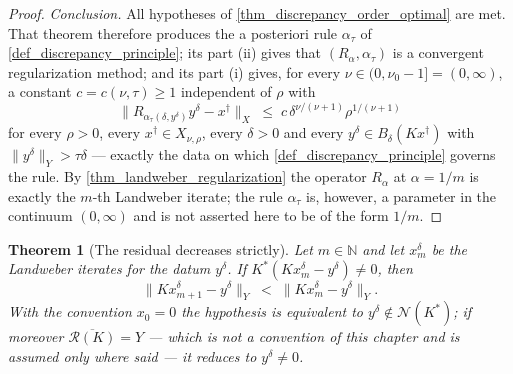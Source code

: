 \documentclass[a4paper]{report}
\theoremstyle{plain}
\newtheorem{theorem}{Theorem}[chapter]
\theoremstyle{definition}
\theoremstyle{remark}
\newcommand{\Ran}{\mathcal{R}}
\newcommand{\Ker}{\mathcal{N}}
\newcommand{\dg}{^{\dagger}}
\begin{document}
\begin{proof}
  \emph{Conclusion.}  All hypotheses of \cref{thm_discrepancy_order_optimal} are met.
  That theorem therefore produces the a posteriori rule $\alpha_{\tau}$ of
  \cref{def_discrepancy_principle}; its part (ii) gives that
  $(R_{\alpha},\alpha_{\tau})$ is a convergent regularization method; and its part (i)
  gives, for every $\nu \in (0,\nu_0-1] = (0,\infty)$, a constant $c = c(\nu,\tau) \ge 1$
  independent of $\rho$ with
  \[
    \bigl\|R_{\alpha_{\tau}(\delta,y^{\delta})}y^{\delta} - x\dg\bigr\|_X
      \;\le\; c\,\delta^{\nu/(\nu+1)}\rho^{1/(\nu+1)}
  \]
  for every $\rho > 0$, every $x\dg \in X_{\nu,\rho}$, every $\delta > 0$ and every
  $y^{\delta} \in B_{\delta}(Kx\dg)$ with $\|y^{\delta}\|_Y > \tau\delta$ --- exactly the
  data on which \cref{def_discrepancy_principle} governs the rule.  By
  \cref{thm_landweber_regularization} the operator $R_{\alpha}$ at $\alpha = 1/m$ is
  exactly the $m$-th Landweber iterate; the rule $\alpha_{\tau}$ is, however, a parameter
  in the continuum $(0,\infty)$ and is not asserted here to be of the form $1/m$.
\end{proof}


\begin{theorem}[The residual decreases strictly]
  \label{thm_landweber_residual_monotone}
  Let $m \in \mathbb{N}$ and let $x^{\delta}_m$ be the Landweber iterates for the datum
  $y^{\delta}$.  If $K^{*}(Kx^{\delta}_m - y^{\delta}) \ne 0$, then
  \[
    \|Kx^{\delta}_{m+1} - y^{\delta}\|_Y \;<\; \|Kx^{\delta}_m - y^{\delta}\|_Y .
  \]
  With the convention $x_0 = 0$ the hypothesis is equivalent to
  $y^{\delta} \notin \Ker(K^{*})$; if moreover $\overline{\Ran(K)} = Y$ --- which is
  \emph{not} a convention of this chapter and is assumed only where said --- it reduces
  to $y^{\delta} \ne 0$.
\end{theorem}
\end{document}
